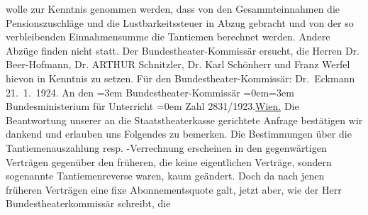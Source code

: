 {\begin{ledgroupsized}[t]{13cm}
               wolle zur Kenntnis genommen werden, dass von den Gesammteinnahmen die
               Pensionszuschläge und die Lustbarkeitssteuer in Abzug gebracht und von der so
               verbleibenden Einnahmensumme die Tantiemen berechnet werden. Andere Abzüge finden
               nicht statt.\pend
           \pstart
           Der Bundestheater-Kommissär
               ersucht, die Herren Dr. Beer-Hofmann, Dr. ARTHUR Schnitzler,
               Dr. Karl Schönherr und Franz Werfel hievon in Kenntnis zu setzen.\pend
           \pstart
           Für den Bundestheater-Kommissär: \spacefill\mbox{Dr. Eckmann}\pend
           {\bigskip}\pstart
           \raggedleft{}{\pb}21. 1. 1924.\pend
           \pstart
           An den\pend
           \leftskip=3em{}\pstart
           \noindent{}Bundestheater-Kommissär\pend
           \leftskip=0em{}\leftskip=3em{}\pstart
           Bundesministerium für Unterricht\pend
           \leftskip=0em{}\pstart
           \noindent{}Zahl 2831/1923.\hfill \uline{Wien.}\pend
           \pstart
           Die Beantwortung unserer an die Staatstheaterkasse
               gerichtete Anfrage bestätigen wir dankend und erlauben uns Folgendes zu bemerken.\pend
           \pstart
           Die Bestimmungen über die Tantiemenauszahlung resp. -Verrechnung erscheinen in den
               gegenwärtigen Verträgen gegenüber den früheren, die keine eigentlichen Verträge,
               sondern sogenannte Tantiemenreverse waren, kaum geändert. Doch da nach jenen früheren
               Verträgen eine fixe Abonnementsquote galt, jetzt aber, wie der Herr Bundestheaterkommissär schreibt, die

\end{ledgroupsized}}
